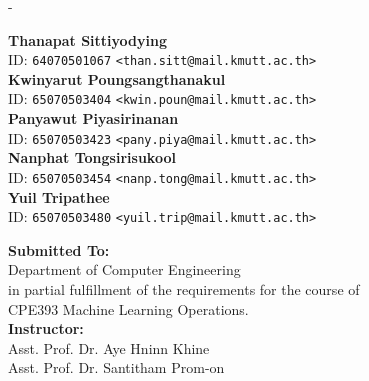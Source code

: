 \begin{titlingpage}
\begin{SingleSpace}
\begin{adjustwidth*}{\unitlength}{-\unitlength}
\begin{center}
				{\large{\textbf{Thanapat Sittiyodying} \\ ID: \texttt{64070501067} \texttt{<than.sitt@mail.kmutt.ac.th>}}} \\
				{\large{\textbf{Kwinyarut Poungsangthanakul} \\ ID: \texttt{65070503404} \texttt{<kwin.poun@mail.kmutt.ac.th>}}} \\ 
				{\large{\textbf{Panyawut Piyasirinanan} \\ ID: \texttt{65070503423} \texttt{<pany.piya@mail.kmutt.ac.th>}}} \\
				{\large{\textbf{Nanphat Tongsirisukool} \\ ID: \texttt{65070503454} \texttt{<nanp.tong@mail.kmutt.ac.th>}}} \\
				{\large{\textbf{Yuil Tripathee} \\ ID: \texttt{65070503480} \texttt{<yuil.trip@mail.kmutt.ac.th>}}} \\
				\vspace{3mm}
				
				\vspace{8mm}
				{\large \textbf{Submitted To:} }\\
				\vspace{2mm}
				{\large {Department of Computer Engineering}}\\
				{\large {in partial fulfillment of the requirements for the course of \\
					CPE393 Machine Learning Operations.}}\\
				
				
				\vspace{8mm}
				{\large \textbf{Instructor:} }\\
				\vspace{2mm}
				{\large{Asst. Prof. Dr. Aye Hninn Khine \\ Asst. Prof. Dr. Santitham Prom-on}}\\
				\vspace{8mm}
				

\end{center}
\end{adjustwidth*}
\end{SingleSpace}
\end{titlingpage}
